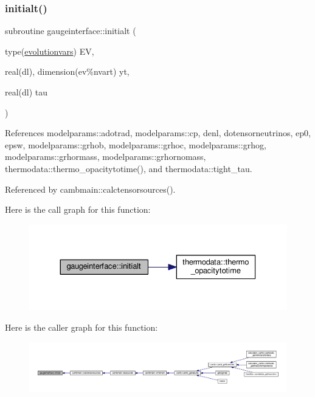 \subsubsection{\texorpdfstring{initialt()}{initialt()}}
{\footnotesize\ttfamily subroutine gaugeinterface\+::initialt (\begin{DoxyParamCaption}\item[{type(\mbox{\hyperlink{structgaugeinterface_1_1evolutionvars}{evolutionvars}})}]{EV,  }\item[{real(dl), dimension(ev\%nvart)}]{yt,  }\item[{real(dl)}]{tau }\end{DoxyParamCaption})}



References modelparams\+::adotrad, modelparams\+::cp, denl, dotensorneutrinos, ep0, epsw, modelparams\+::grhob, modelparams\+::grhoc, modelparams\+::grhog, modelparams\+::grhormass, modelparams\+::grhornomass, thermodata\+::thermo\+\_\+opacitytotime(), and thermodata\+::tight\+\_\+tau.



Referenced by cambmain\+::calctensorsources().

Here is the call graph for this function\+:
\nopagebreak
\begin{figure}[H]
\begin{center}
\leavevmode
\includegraphics[width=330pt]{namespacegaugeinterface_afbc0a211756e4b923725483b6c961e75_cgraph}
\end{center}
\end{figure}
Here is the caller graph for this function\+:
\nopagebreak
\begin{figure}[H]
\begin{center}
\leavevmode
\includegraphics[width=350pt]{namespacegaugeinterface_afbc0a211756e4b923725483b6c961e75_icgraph}
\end{center}
\end{figure}
\mbox{\label{namespacegaugeinterface_aeed464df3ecab21d57bcb789fe3b1a22}} 
